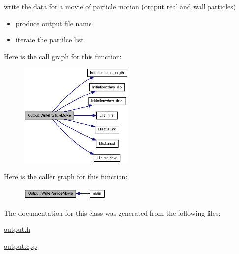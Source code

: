 write the data for a movie of particle motion (output real and wall particles) 



\begin{itemize}
\item produce output file name\end{itemize}


\begin{itemize}
\item iterate the partilce list \end{itemize}


Here is the call graph for this function:\nopagebreak
\begin{figure}[H]
\begin{center}
\leavevmode
\includegraphics[width=160pt]{classOutput_3ff4c5c04d9f7e89eb3f36b299256f10_cgraph}
\end{center}
\end{figure}


Here is the caller graph for this function:\nopagebreak
\begin{figure}[H]
\begin{center}
\leavevmode
\includegraphics[width=125pt]{classOutput_3ff4c5c04d9f7e89eb3f36b299256f10_icgraph}
\end{center}
\end{figure}


The documentation for this class was generated from the following files:\begin{CompactItemize}
\item 
\hyperlink{output_8h}{output.h}\item 
\hyperlink{output_8cpp}{output.cpp}\end{CompactItemize}
